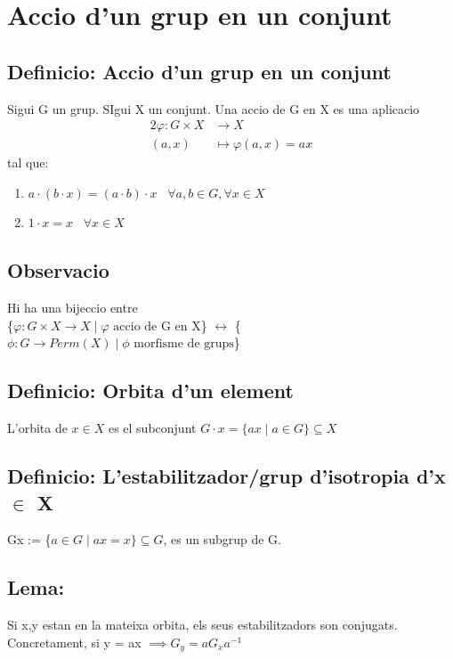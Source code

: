 \documentclass[11pt]{article}
\begin{document}
\section{Accio d'un grup en un conjunt}
\label{sec:orgf68e2d3}
\subsection{Definicio: Accio d'un grup en un conjunt}
\label{sec:org64225db}
Sigui G un grup. SIgui X un conjunt. Una accio de G en X es una aplicacio
\begin{alignat*}{2}
\varphi : G \times X &\to X \\
(a, x) &\mapsto \varphi(a,x) = ax
\end{alignat*}
tal que:
\begin{enumerate}
\item \(a \cdot (b \cdot x) = (a \cdot b) \cdot x \hspace{10pt}  \forall a,b \in G, \forall x \in X\)
\item \(1 \cdot x = x \hspace{10pt} \forall x \in X\)
\end{enumerate}
\subsection{Observacio}
\label{sec:orgb9528f3}
Hi ha una bijeccio entre \\
\{\(\varphi: G \times X \to X \mid \varphi \text{ accio de G en X}\)\} \(\leftrightarrow\) \{\(\phi: G \to Perm(X) \mid \phi \text{ morfisme de grups}\)\}
\subsection{Definicio: Orbita d'un element}
\label{sec:org6f56149}
L'orbita de \(x \in X\) es el subconjunt \(G \cdot x = \{ax \mid a \in G \} \subseteq X\)
\subsection{Definicio: L'estabilitzador/grup d'isotropia d'x \(\in\) X}
\label{sec:orga20a9b9}
Gx := \{\(a \in G \mid ax = x \} \subseteq G\), es un subgrup de G.
\subsection{Lema:}
\label{sec:org660e68a}
Si x,y estan en la mateixa orbita, els seus estabilitzadors son conjugats. \\
Concretament, si y = ax \(\implies G_y = aG_{x}a^{-1}\)
\end{document}

